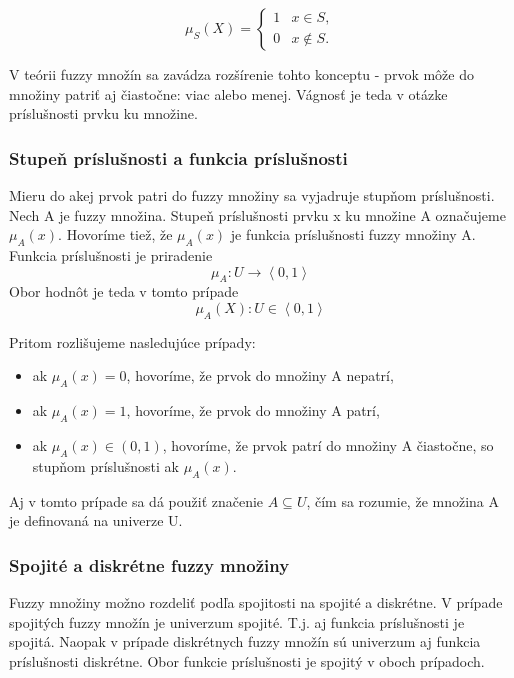 \begin{equation}\label{charfunkciafuzzy}
\mu_S (X) = 
\begin{cases}
1 &  x \in S, \\
0 &  x \notin S.
\end{cases}
\end{equation}

V teórii fuzzy množín sa zavádza rozšírenie tohto konceptu - prvok môže do množiny patriť aj čiastočne: viac alebo menej. Vágnosť je teda v otázke príslušnosti prvku ku množine. 

\subsubsection{Stupeň príslušnosti a funkcia príslušnosti}
Mieru do akej prvok patri do fuzzy množiny sa vyjadruje stupňom príslušnosti. Nech A je fuzzy množina. Stupeň príslušnosti prvku x ku množine A označujeme $\mu_A\left( x\right) $. 
Hovoríme tiež, že $\mu_A\left( x\right) $ je funkcia príslušnosti fuzzy množiny A. 
Funkcia príslušnosti je priradenie
\begin{equation}\label{funPrislus}
\mu_A : U \longrightarrow \left\langle 0, 1 \right\rangle 
\end{equation}
Obor hodnôt je teda v tomto prípade 
\begin{equation}\label{funPrislus}
\mu_A (X) : U \in \left\langle 0, 1 \right\rangle 
\end{equation}

Pritom rozlišujeme nasledujúce prípady: 
\begin{itemize}
	\item ak $\mu_A (x) = 0$, hovoríme, že prvok do množiny A nepatrí, 
	\item ak $\mu_A (x) = 1$, hovoríme, že prvok do množiny A patrí, 
	\item ak $\mu_A (x) \in (0, 1)$, hovoríme, že prvok patrí do množiny A čiastočne, so stupňom príslušnosti ak $\mu_A(x)$. 
\end{itemize}

Aj v tomto prípade sa dá použiť značenie $A\subseteq U$, čím sa rozumie, že množina A je definovaná na univerze U. 

\subsubsection{Spojité a diskrétne fuzzy množiny}
Fuzzy množiny možno rozdeliť podľa spojitosti na spojité a diskrétne. V prípade spojitých fuzzy množín je univerzum spojité. T.j. aj funkcia príslušnosti je spojitá. Naopak v prípade diskrétnych fuzzy množín sú univerzum aj funkcia príslušnosti diskrétne. Obor funkcie príslušnosti je spojitý v oboch prípadoch. 


